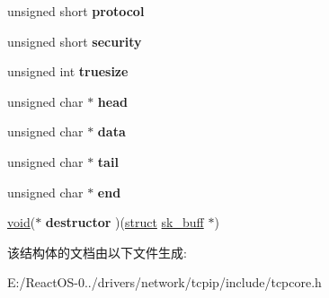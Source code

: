 \begin{DoxyCompactItemize}
unsigned short {\bfseries protocol}
\item 
\mbox{\label{structsk__buff_a33cc980e20fe32dda19df899e103f5ae}} 
unsigned short {\bfseries security}
\item 
\mbox{\label{structsk__buff_ae0cef94738b431d44699ee7ef0b27c7e}} 
unsigned int {\bfseries truesize}
\item 
\mbox{\label{structsk__buff_a00a36433a3b6fd11430904fe2503c3fc}} 
unsigned char $\ast$ {\bfseries head}
\item 
\mbox{\label{structsk__buff_ac88c12ecfe0d137c61c26ec7323283f7}} 
unsigned char $\ast$ {\bfseries data}
\item 
\mbox{\label{structsk__buff_acdb71e6d93047fff79be7c188abc3274}} 
unsigned char $\ast$ {\bfseries tail}
\item 
\mbox{\label{structsk__buff_a5018eaeadbe69619497db0f073347f42}} 
unsigned char $\ast$ {\bfseries end}
\item 
\mbox{\label{structsk__buff_ae11c1f07f77f4a074b17cecce0701153}} 
\hyperlink{interfacevoid}{void}($\ast$ {\bfseries destructor} )(\hyperlink{interfacestruct}{struct} \hyperlink{structsk__buff}{sk\+\_\+buff} $\ast$)
\end{DoxyCompactItemize}


该结构体的文档由以下文件生成\+:\begin{DoxyCompactItemize}
\item 
E\+:/\+React\+O\+S-\/0../drivers/network/tcpip/include/tcpcore.\+h\end{DoxyCompactItemize}
